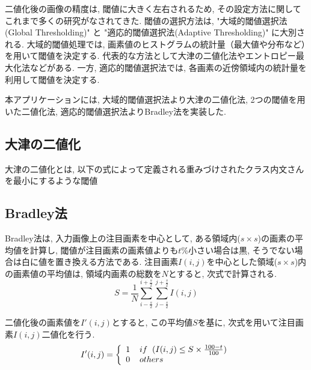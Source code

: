\documentclass{suribt}
\begin{document}
二値化後の画像の精度は, 閾値に大きく左右されるため, その設定方法に関してこれまで多くの研究がなされてきた\cite{Otsu-1979, Bradley-2007}. 閾値の選択方法は, "大域的閾値選択法(Global Thresholding)" と "適応的閾値選択法(Adaptive Thresholding)" に大別される. 大域的閾値処理では, 画素値のヒストグラムの統計量（最大値や分布など）を用いて閾値を決定する. 代表的な方法として大津の二値化法やエントロピー最大化法などがある. 一方, 適応的閾値選択法では, 各画素の近傍領域内の統計量を利用して閾値を決定する. 

本アプリケーションには, 大域的閾値選択法より大津の二値化法, 2つの閾値を用いた二値化法, 適応的閾値選択法よりBradley法を実装した. 
\subsection{大津の二値化}
大津の二値化とは, 以下の式によって定義される重みづけされたクラス内文さんを最小にするような閾値

\subsection{Bradley法}
Bradley法は, 入力画像上の注目画素を中心として, ある領域内($s \times s$)の画素の平均値を計算し, 閾値が注目画素の画素値よりも$t\%$小さい場合は黒, そうでない場合は白に値を置き換える方法である. 
注目画素$I(i, j)$を中心とした領域($s \times s$)内の画素値の平均値は, 領域内画素の総数を$N$とすると, 次式で計算される.
\begin{equation}
	S = \frac{1}{N} \sum_{i-\frac{s}{2}}^{i+\frac{s}{2}} \sum_{j-\frac{s}{2}}^{j+\frac{s}{2}} I(i, j)
\end{equation}

二値化後の画素値を$I'(i, j)$とすると, この平均値$S$を基に, 次式を用いて注目画素$I(i, j)$二値化を行う.
\begin{equation}
	I'(i, j) = \left\{
		\begin{array}{l}
			1 \hspace{4mm} if \hspace{2mm} (I(i, j) \leq S \times \frac{100 - t}{100})\\
			0 \hspace{4mm} others
		\end{array}
		\right.
\end{equation}

\end{document}
